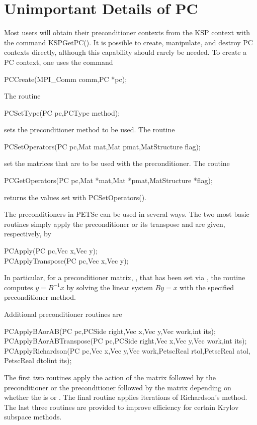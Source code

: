 {{{\section{Unimportant Details of PC}

Most users will obtain their preconditioner contexts from the KSP
context with the command KSPGetPC(). It is possible to create,
manipulate, and destroy PC contexts directly, although this capability
should rarely be needed. To create a PC context, one uses the command
\begin{tabbing}
  PCCreate(MPI\_Comm comm,PC *pc);
\end{tabbing}
The routine 
\begin{tabbing}
  PCSetType(PC pc,PCType method);
\end{tabbing}
sets the preconditioner method to be used. 
The routine 
\begin{tabbing}
  PCSetOperators(PC pc,Mat mat,Mat pmat,MatStructure flag);\\
\end{tabbing}
set the matrices that are to be used with 
the preconditioner.  
The routine 
\begin{tabbing}
  PCGetOperators(PC pc,Mat *mat,Mat *pmat,MatStructure *flag);
\end{tabbing}
returns the values set with PCSetOperators().

  
The preconditioners in PETSc can be used in several ways.  The two
most basic routines simply apply the preconditioner or its transpose
and are given, respectively, by
\begin{tabbing}
  PCApply(PC pc,Vec x,Vec y);\\
  PCApplyTranspose(PC pc,Vec x,Vec y);
\end{tabbing}
In particular, for a preconditioner matrix, , that has
been set via ,
the routine  computes $y = B^{-1} x$
by solving the linear system $By = x$ with the specified preconditioner
method.

 
Additional preconditioner routines are
\begin{tabbing}
  PCApplyBAorAB(PC pc,PCSide right,Vec x,Vec y,Vec work,int its);\\
  PCApplyBAorABTranspose(PC pc,PCSide right,Vec x,Vec y,Vec work,int its);\\
  PCApplyRichardson(PC pc,Vec x,Vec y,Vec work,PetscReal rtol,PetscReal atol, PetscReal dtolint its);
\end{tabbing}
The first two routines apply the action of the matrix followed by the
preconditioner or the preconditioner followed by the matrix depending
on whether the   is
 or . The final routine applies  iterations of
Richardson's method.   
The last three routines are provided to improve
efficiency for certain Krylov subspace methods.

}}}
